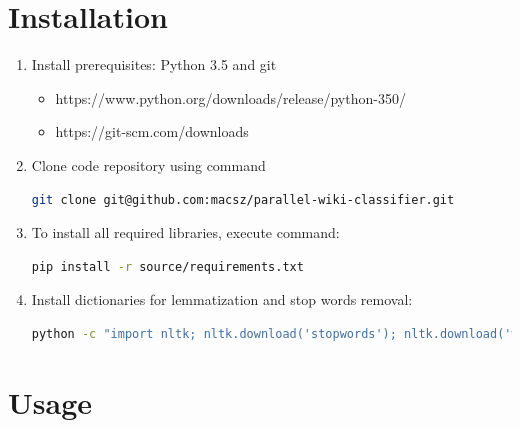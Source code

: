 \section{Installation}
\begin{enumerate}
	\item Install prerequisites: Python 3.5 and git
	\begin{itemize}
		\item https://www.python.org/downloads/release/python-350/
		\item https://git-scm.com/downloads
	\end{itemize}
	\item Clone code repository using command
\begin{lstlisting}[language=Bash, numbers=none]
git clone git@github.com:macsz/parallel-wiki-classifier.git
\end{lstlisting}
	\item To install all required libraries, execute command:
\begin{lstlisting}[language=Bash, numbers=none]
pip install -r source/requirements.txt
\end{lstlisting}
\item Install dictionaries for lemmatization and stop words removal:
\begin{lstlisting}[language=Bash, numbers=none]
python -c "import nltk; nltk.download('stopwords'); nltk.download('wordnet')"
\end{lstlisting}
\end{enumerate}
\section{Usage}

